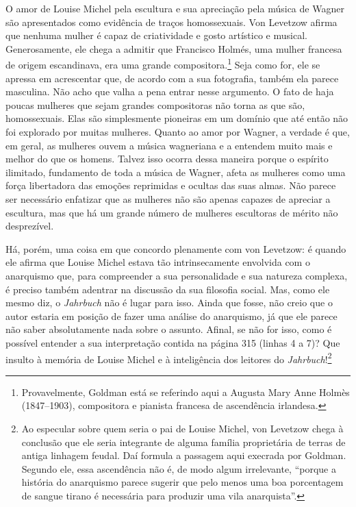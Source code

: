 O amor de Louise Michel pela escultura e sua apreciação pela música de
Wagner são apresentados como evidência de traços homossexuais. Von
Levetzow afirma que nenhuma mulher é capaz de criatividade e gosto
artístico e musical. Generosamente, ele chega a admitir que Francisco
Holmés, uma mulher francesa de origem escandinava, era uma grande
compositora.\footnote{Provavelmente, Goldman está se referindo aqui a
  Augusta Mary Anne Holmès (1847--1903), compositora e pianista francesa
  de ascendência irlandesa.} Seja como for, ele se apressa em
acrescentar que, de acordo com a sua fotografia, também ela parece masculina.
Não acho que valha a pena entrar nesse argumento. O fato de haja poucas
mulheres que sejam grandes compositoras não torna as que são,
homossexuais. Elas são simplesmente pioneiras em um domínio que até
então não foi explorado por muitas mulheres. Quanto ao amor por Wagner,
a verdade é que, em geral, as mulheres ouvem a música wagneriana e a
entendem muito mais e melhor do que os homens. Talvez isso ocorra dessa
maneira porque o espírito ilimitado, fundamento de toda a música de Wagner,
afeta as mulheres como uma força libertadora das emoções reprimidas e
ocultas das suas almas. Não parece ser necessário enfatizar que as
mulheres não são apenas capazes de apreciar a escultura, mas que há um
grande número de mulheres escultoras de mérito não desprezível.

Há, porém, uma coisa em que concordo plenamente com von Levetzow: é
quando ele afirma que Louise Michel estava tão intrinsecamente envolvida
com o anarquismo que, para compreender a sua personalidade e sua natureza
complexa, é preciso também adentrar na discussão da sua filosofia
social. Mas, como ele mesmo diz, o \emph{Jahrbuch} não é lugar para
isso. Ainda que fosse, não creio que o autor estaria em posição de fazer
uma análise do anarquismo, já que ele parece não saber absolutamente
nada sobre o assunto. Afinal, se não for isso, como é possível entender
a sua interpretação contida na página 315 (linhas 4 a 7)? Que insulto à
memória de Louise Michel e à inteligência dos leitores do
\emph{Jahrbuch}!\footnote{Ao especular sobre quem seria o pai de Louise
  Michel, von Levetzow chega à conclusão que ele seria integrante de
  alguma família proprietária de terras de antiga linhagem feudal. Daí
  formula a passagem aqui execrada por Goldman. Segundo ele, essa
  ascendência não é, de modo algum irrelevante, ``porque a história do
  anarquismo parece sugerir que pelo menos uma boa porcentagem de sangue
  tirano é necessária para produzir uma vila anarquista''.}

